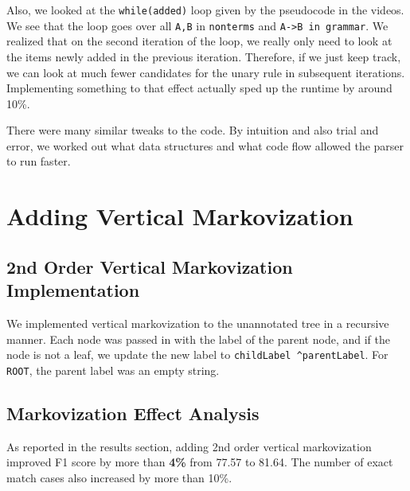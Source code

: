\documentclass[12pt]{article}
\begin{document}
Also, we looked at the \texttt{while(added)} loop given by the pseudocode in the videos. We see that the loop goes over all \texttt{A,B} in \texttt{nonterms} and \texttt{A->B in grammar}. We realized that on the second iteration of the loop, we really only need to look at the items newly added in the previous iteration. Therefore, if we just keep track, we can look at much fewer candidates for the unary rule in subsequent iterations. Implementing something to that effect actually sped up the runtime by around 10\%.

There were many similar tweaks to the code. By intuition and also trial and error, we worked out what data structures and what code flow allowed the parser to run faster.
\section{Adding Vertical Markovization}
\subsection{2nd Order Vertical Markovization Implementation}
We implemented vertical markovization to the unannotated tree in a recursive manner. Each node was passed in with the label of the parent node, and if the node is not a leaf, we update the new label to \texttt{childLabel \string^parentLabel}. For \texttt{ROOT}, the parent label was an empty string.
\subsection{Markovization Effect Analysis}
As reported in the results section, adding 2nd order vertical markovization improved F1 score by more than \textbf{4\%} from 77.57 to 81.64. The number of exact match cases also increased by more than 10\%.
\end{document}
